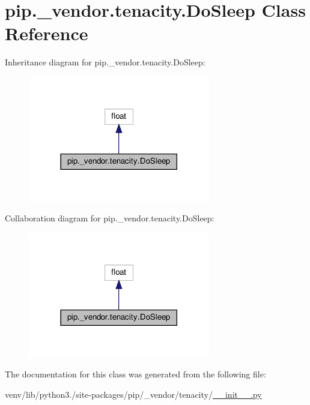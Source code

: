 \hypertarget{classpip_1_1__vendor_1_1tenacity_1_1DoSleep}{}\section{pip.\+\_\+vendor.\+tenacity.\+Do\+Sleep Class Reference}
\label{classpip_1_1__vendor_1_1tenacity_1_1DoSleep}


Inheritance diagram for pip.\+\_\+vendor.\+tenacity.\+Do\+Sleep\+:
\nopagebreak
\begin{figure}[H]
\begin{center}
\leavevmode
\includegraphics[width=225pt]{classpip_1_1__vendor_1_1tenacity_1_1DoSleep__inherit__graph}
\end{center}
\end{figure}


Collaboration diagram for pip.\+\_\+vendor.\+tenacity.\+Do\+Sleep\+:
\nopagebreak
\begin{figure}[H]
\begin{center}
\leavevmode
\includegraphics[width=225pt]{classpip_1_1__vendor_1_1tenacity_1_1DoSleep__coll__graph}
\end{center}
\end{figure}


The documentation for this class was generated from the following file\+:\begin{DoxyCompactItemize}
\item 
venv/lib/python3./site-\/packages/pip/\+\_\+vendor/tenacity/\hyperlink{venv_2lib_2python3_89_2site-packages_2pip_2__vendor_2tenacity_2____init_____8py}{\+\_\+\+\_\+init\+\_\+\+\_\+.\+py}\end{DoxyCompactItemize}
